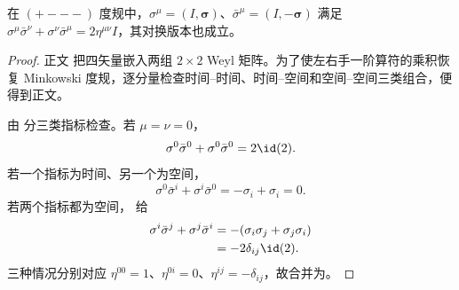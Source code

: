 \begin{lemma}
在 $(+---)$ 度规中，$\sigma^\mu=(I,\boldsymbol\sigma)$、$\bar\sigma^\mu=(I,-\boldsymbol\sigma)$ 满足 $\sigma^\mu\bar\sigma^\nu+\sigma^\nu\bar\sigma^\mu=2\eta^{\mu\nu}I$，其对换版本也成立。
\end{lemma}
\begin{proof}
正文 把四矢量嵌入两组 $2\times2$ Weyl 矩阵。为了使左右手一阶算符的乘积恢复 Minkowski 度规，逐分量检查时间--时间、时间--空间和空间--空间三类组合，便得到正文。



由 分三类指标检查。若 $\mu=\nu=0$，
\begin{equation*}
 \sigma^0\bar\sigma^0+\sigma^0\bar\sigma^0=2\id(2).
\end{equation*}
若一个指标为时间、另一个为空间，
\begin{equation*}
 \sigma^0\bar\sigma^i+\sigma^i\bar\sigma^0
 =-\sigma_i+\sigma_i=0.
\end{equation*}
若两个指标都为空间， 给
\begin{align*}
 \sigma^i\bar\sigma^j+\sigma^j\bar\sigma^i
 &=-(\sigma_i\sigma_j+\sigma_j\sigma_i)\\
 &=-2\delta_{ij}\id(2).
\end{align*}
三种情况分别对应 $\eta^{00}=1$、$\eta^{0i}=0$、$\eta^{ij}=-\delta_{ij}$，故合并为。
\end{proof}

